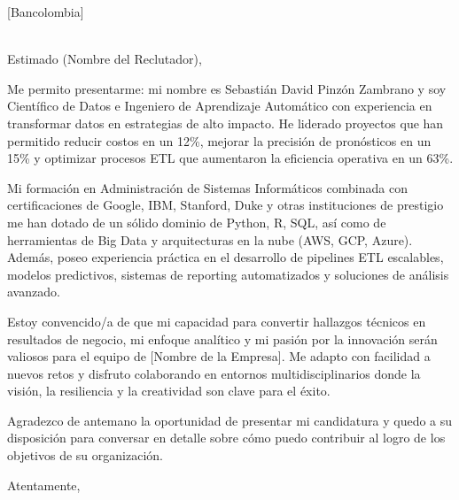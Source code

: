 \documentclass[11pt,a4paper]{letter}
\date{\today}
\begin{document}
\begin{letter}{[Bancolombia] \\
[] \\
[Bogota, Colombia]}

\opening{Estimado (Nombre del Reclutador),}

Me permito presentarme: mi nombre es Sebastián David Pinzón Zambrano y soy Científico de Datos e Ingeniero de Aprendizaje Automático con experiencia en transformar datos en estrategias de alto impacto. He liderado proyectos que han permitido reducir costos en un 12\%, mejorar la precisión de pronósticos en un 15\% y optimizar procesos ETL que aumentaron la eficiencia operativa en un 63\%.

Mi formación en Administración de Sistemas Informáticos combinada con certificaciones de Google, IBM, Stanford, Duke y otras instituciones de prestigio me han dotado de un sólido dominio de Python, R, SQL, así como de herramientas de Big Data y arquitecturas en la nube (AWS, GCP, Azure). Además, poseo experiencia práctica en el desarrollo de pipelines ETL escalables, modelos predictivos, sistemas de reporting automatizados y soluciones de análisis avanzado.

Estoy convencido/a de que mi capacidad para convertir hallazgos técnicos en resultados de negocio, mi enfoque analítico y mi pasión por la innovación serán valiosos para el equipo de [Nombre de la Empresa]. Me adapto con facilidad a nuevos retos y disfruto colaborando en entornos multidisciplinarios donde la visión, la resiliencia y la creatividad son clave para el éxito.

Agradezco de antemano la oportunidad de presentar mi candidatura y quedo a su disposición para conversar en detalle sobre cómo puedo contribuir al logro de los objetivos de su organización.

\closing{Atentamente,}


\end{letter}
\end{document}
